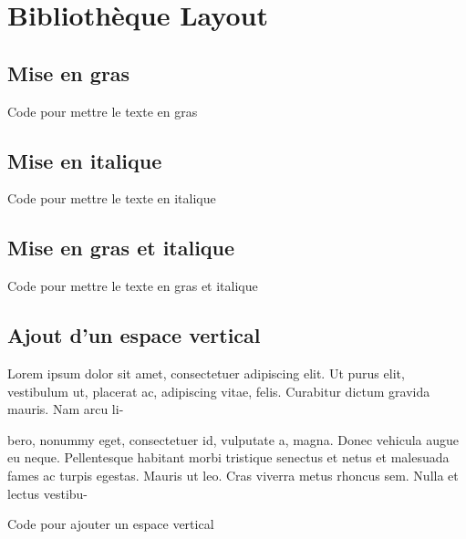 \chapter{Bibliothèque Layout}


\section{Mise en gras}

\sn

\begin{Latex}{Code pour mettre le texte en gras}
\end{Latex}

\section{Mise en italique}

\sn
{}
\begin{Latex}{Code pour mettre le texte en italique}
\end{Latex}

\section{Mise en gras et italique}

\sn

\begin{Latex}{Code pour mettre le texte en gras et italique}
\end{Latex}


\section{Ajout d'un espace vertical}

Lorem ipsum dolor sit amet, consectetuer adipiscing elit. Ut purus elit, vestibulum
ut, placerat ac, adipiscing vitae, felis. Curabitur dictum gravida mauris. Nam arcu li- \sn

bero, nonummy eget, consectetuer id, vulputate a, magna. Donec vehicula augue eu
neque. Pellentesque habitant morbi tristique senectus et netus et malesuada fames ac
turpis egestas. Mauris ut leo. Cras viverra metus rhoncus sem. Nulla et lectus vestibu-

\begin{Latex}{Code pour ajouter un espace vertical}
\sn
\end{Latex}